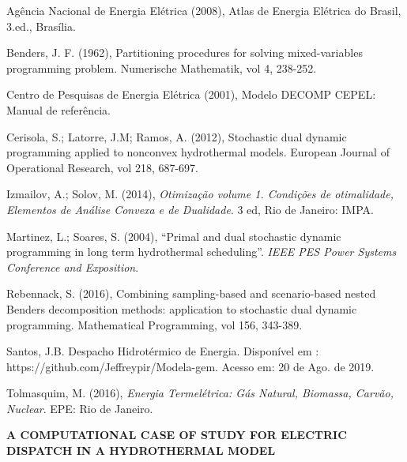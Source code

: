 \documentclass[12pt,fleqn]{article}
\begin{document}
\begin{description}[noitemsep, labelindent=-0.2cm,leftmargin=0.4cm]
\fontsize{11}{0}\selectfont
\item
Ag\^encia Nacional de Energia El\'etrica (2008), Atlas de Energia Elétrica do Brasil, 3.ed., Brasília.
\item
Benders, J. F. (1962), Partitioning procedures for solving mixed-variables programming problem. Numerische Mathematik,
vol 4, 238-252.
\item
Centro de Pesquisas de Energia Elétrica (2001), Modelo DECOMP CEPEL: Manual de refer\^encia.
\item
Cerisola, S.; Latorre, J.M; Ramos, A. (2012), Stochastic dual dynamic programming applied to nonconvex hydrothermal models.
European Journal of Operational Research, vol 218, 687-697.
\item
Izmailov, A.; Solov, M. (2014), {\em Otimiza\c c\~ao volume 1. Condi\c c\~oes de otimalidade, Elementos de An\'alise Convexa e
de Dualidade}. 3 ed, Rio de Janeiro: IMPA. 
\item
Martinez, L.; Soares, S. (2004), ``Primal and dual stochastic dynamic programming in long term hydrothermal scheduling''.
{\em IEEE PES Power Systems Conference and Exposition}.
\item
Rebennack, S. (2016), Combining  sampling-based and scenario-based nested Benders decomposition methods: application to
stochastic dual dynamic programming. Mathematical Programming, vol 156, 343-389. 
\item
Santos, J.B. Despacho Hidrot\'ermico de Energia. Dispon\'ivel em : https://github.com/Jeffreypir/Modela-gem. Acesso em: 20 de Ago. de 2019.
\item
  Tolmasquim, M. (2016), {\em Energia Termel\'etrica: G\'as Natural, Biomassa, Carv\~ao, Nuclear}. EPE: Rio de Janeiro.
\end{description}
\vspace*{-0.1cm}


\begin{center}
 \textbf {A COMPUTATIONAL CASE OF STUDY FOR ELECTRIC DISPATCH IN A HYDROTHERMAL MODEL}
\end{center}

\def\abstractname{Abstract}%
\end{document}

